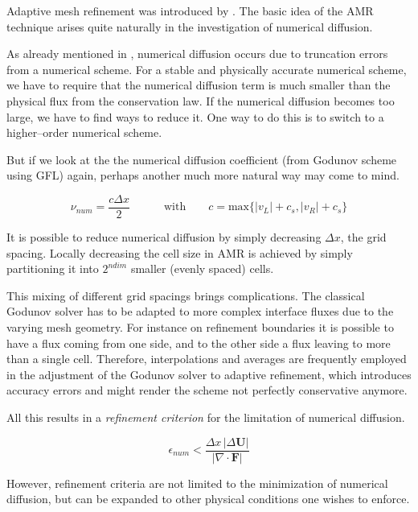 Adaptive mesh refinement was introduced by \citet{AMR_colella}.
The basic idea of the AMR technique arises quite naturally in the investigation of numerical diffusion.

As already mentioned in , numerical diffusion occurs due to truncation errors from a numerical scheme.
For a stable and physically accurate numerical scheme, we have to require that the numerical diffusion term is much smaller than the physical flux from the conservation law.
If the numerical diffusion becomes too large, we have to find ways to reduce it.
One way to do this is to switch to a higher--order numerical scheme.

But if we look at the the numerical diffusion coefficient (from Godunov scheme using GFL) again, perhaps another much more natural way may come to mind.

\begin{equation*}
  \nu_{num} = \frac{c\Delta x}{2} \qquad\quad\text{with}\qquad c = \mathrm{max}\big\{ \vert v_{L}\vert + c_{s}, \vert v_{R}\vert + c_{s} \big\}
\end{equation*}

It is possible to reduce numerical diffusion by simply decreasing $\Delta x$, the grid spacing.
Locally decreasing the cell size in AMR is achieved by simply partitioning it into $2^{ndim}$ smaller (evenly spaced) cells.

This mixing of different grid spacings brings complications.
The classical Godunov solver has to be adapted to more complex interface fluxes due to the varying mesh geometry.
For instance on refinement boundaries it is possible to have a flux coming from one side, and to the other side a flux leaving to more than a single cell.
Therefore, interpolations and averages are frequently employed in the adjustment of the Godunov solver to adaptive refinement, which introduces accuracy errors and might render the scheme not perfectly conservative anymore.

All this results in a \textit{refinement criterion} for the limitation of numerical diffusion.

\begin{equation}
  \epsilon_{num} < \frac{\Delta x\,\vert\Delta \textbf{U}\vert}{\vert\nabla\cdot\textbf{F}\vert}
\end{equation}

However, refinement criteria are not limited to the minimization of numerical diffusion, but can be expanded to other physical conditions one wishes to enforce.

